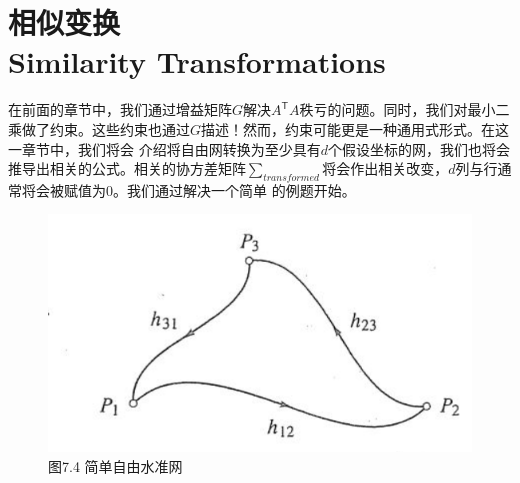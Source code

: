 \section[相似变换]{相似变换\\Similarity Transformations}	
\par\noindent
在前面的章节中，我们通过增益矩阵$G$解决$A^\mathsf{T}A$秩亏的问题。同时，我们对最小二乘做了约束。这些约束也通过$G$描述！然而，约束可能更是一种通用式形式。在这一章节中，我们将会
介绍将自由网转换为至少具有$d$个假设坐标的网，我们也将会推导出相关的公式。相关的协方差矩阵$\sum_{transformed}$将会作出相关改变，$d$列与行通常将会被赋值为0。我们通过解决一个简单
的例题开始。
\begin{figure}
	\centering
	\includegraphics[width=0.4\linewidth]{TeX_files/Part02/chapter07/image/7-4}
	\caption{图7.4  简单自由水准网}
	\label{fig:7-4}
\end{figure}

